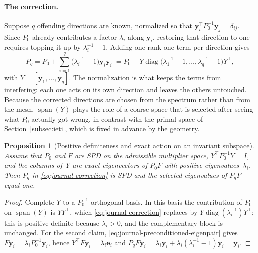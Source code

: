 \documentclass{article}
\newcommand{\vect}[1]{\boldsymbol{#1}}
\DeclareMathOperator{\spann}{span}
\newcommand{\Fschur}{F}                           %
\theoremstyle{plain}
\newtheorem{prop}{Proposition}
\numberwithin{equation}{section}
\begin{document}
\paragraph{The correction.}
Suppose $q$ offending directions are known, normalized so that
$\vect y_i^\top P_0^{-1}\vect y_j=\delta_{ij}$.  Since $P_0$ already
contributes a factor $\lambda_i$ along $\vect y_i$, restoring that direction to
one requires topping it up by $\lambda_i^{-1}-1$.  Adding one rank-one term
per direction gives
\begin{equation}
    P_q=P_0+\sum_{i=1}^{q}\bigl(\lambda_i^{-1}-1\bigr)\vect y_i\vect y_i^\top
    =P_0+Y\operatorname{diag}\bigl(\lambda_1^{-1}-1,\ldots,
    \lambda_q^{-1}-1\bigr)Y^\top,
    \label{eq:journal-correction}
\end{equation}
with $Y=[\vect y_1,\ldots,\vect y_q]$.  The normalization is what keeps the
terms from interfering: each one acts on its own direction and leaves the
others untouched.  Because the corrected directions are chosen from the
spectrum rather than from the mesh, $\spann(Y)$ plays the role of a coarse
space that is selected after seeing what $P_0$ actually got wrong, in contrast
with the primal space of Section~\ref{subsec:ieti}, which is fixed in advance
by the geometry.

\begin{prop}[Positive definiteness and exact action on an invariant subspace]
    \label{prop:journal-spd}
    Assume that $P_0$ and $\Fschur$ are SPD on the admissible multiplier space,
    $Y^\top P_0^{-1}Y=I$, and the columns of~$Y$ are exact eigenvectors of
    $P_0\Fschur$ with positive eigenvalues~$\lambda_i$.  Then $P_q$ in
    \eqref{eq:journal-correction} is SPD and the selected eigenvalues of
    $P_q\Fschur$ equal one.
\end{prop}
\begin{proof}
    Complete $Y$ to a $P_0^{-1}$-orthogonal basis.  In this basis the
    contribution of $P_0$ on $\spann(Y)$ is $YY^\top$, which
    \eqref{eq:journal-correction} replaces by
    $Y\operatorname{diag}(\lambda_i^{-1})Y^\top$; this is positive definite
    because $\lambda_i>0$, and the complementary block is unchanged.  For the
    second claim, \eqref{eq:journal-preconditioned-eigenpair} gives
    $\Fschur\vect y_i=\lambda_iP_0^{-1}\vect y_i$, hence
    $Y^\top\Fschur\vect y_i=\lambda_i\vect e_i$ and
    $P_q\Fschur\vect y_i=\lambda_i\vect y_i
        +\lambda_i(\lambda_i^{-1}-1)\vect y_i=\vect y_i$.
\end{proof}
\end{document}
